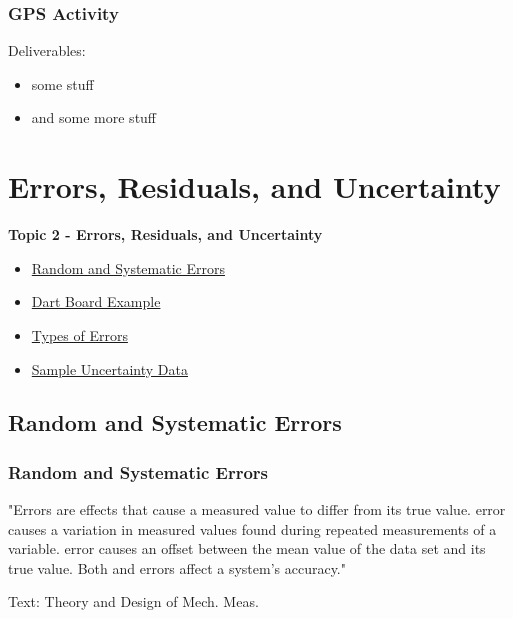 \documentclass[fleqn]{beamer} %
\newcommand{\sectionIItitle}{Errors, Residuals, and Uncertainty}
\newcommand{\sectionIsubsectionIVtitle}{GPS Activity}
\newcommand{\sectionIIsubsectionItitle}{Random and Systematic Errors}
\newcommand{\sectionIIsubsectionIItitle}{Dart Board Example}
\newcommand{\sectionIIsubsectionIIItitle}{Types of Errors}
\newcommand{\sectionIIsubsectionIVtitle}{Sample Uncertainty Data}
\begin{document}
			\begin{frame}
				\frametitle{\sectionIsubsectionIVtitle}
				Deliverables:
				\begin{itemize}
					\item some stuff
					\item and some more stuff
				\end{itemize}
				


			\end{frame}

	\section{\sectionIItitle}\label{sectionII}

		\begin{frame}
			\large \textbf{Topic 2 - \sectionIItitle} \vspace{3mm}\\

			\begin{itemize}
				\item \hyperlink{sectionIIsubsectionI}{\sectionIIsubsectionItitle} \vspc %
				\item \hyperlink{sectionIIsubsectionII}{\sectionIIsubsectionIItitle} \vspc %
				\item \hyperlink{sectionIIsubsectionIII}{\sectionIIsubsectionIIItitle} \vspc %
				\item \hyperlink{sectionIIsubsectionIV}{\sectionIIsubsectionIVtitle} \vspc %
			\end{itemize}

		\end{frame}

		\subsection{\sectionIIsubsectionItitle}\label{sectionIIsubsectionI}

			\begin{frame}[label=sectionIIsubsectionI]
				\frametitle{\sectionIIsubsectionItitle}

				"Errors are effects that cause a  measured value to differ from its true value. \hspcu error causes a
				\hspcu variation in measured values found during repeated measurements of a variable. \vspc
				\hspcu error causes an offset between the mean value of the data set and its true value. Both \hspcu and
				\hspcu errors affect a system's accuracy."

				\vspace{10mm}
				{\tiny Text: Theory and Design of Mech. Meas.}

			\end{frame}
\end{document}
